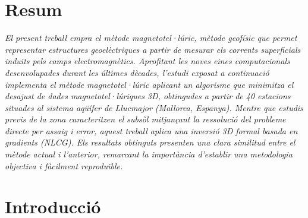 \documentclass[11pt,a4paper,oneside]{article}
\begin{document}


\section*{Resum}
\textit{El present treball empra el mètode magnetotel·lúric, mètode geofísic que permet representar estructures geoelèctriques a partir de mesurar els corrents superficials induïts pels camps electromagnètics. Aprofitant les noves eines computacionals desenvolupades durant les últimes dècades, l'estudi exposat a continuació implementa el mètode magnetotel·lúric aplicant un algorisme que minimitza el desajust de dades magnetotel·lúriques 3D, obtingudes a partir de 40 estacions situades al sistema aqüífer de Llucmajor (Mallorca, Espanya). Mentre que estudis previs de la zona caracteritzen el subsòl mitjançant la ressolució del probleme directe per assaig i error, aquest treball aplica una inversió 3D formal basada en gradients (NLCG). Els resultats obtinguts presenten una clara similitud entre el mètode actual i l’anterior, remarcant la importància d’establir una metodologia objectiva i fàcilment reproduïble. }




\clearpage
\tableofcontents

\clearpage
{}  %

\section{Introducció}
\end{document}
